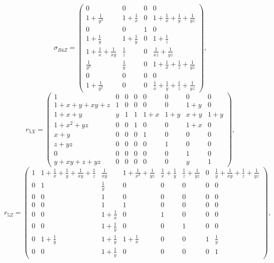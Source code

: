\[
 \sigma_{B4Z} =
\left(\begin{array}{cc|c|c}
 0 & 0 & 0 & 0 \\
\hline
 1+\frac{1}{y^2} & 1+\frac{1}{x} & 0 & 1+\frac{1}{x}+\frac{1}{y}+\frac{1}{y z} \\
\hline
 0 & 0 & 1 & 0 \\
\hline
 1+\frac{1}{y} & 1+\frac{1}{y} & 0 & 1+\frac{1}{z} \\
 1+\frac{1}{x}+\frac{1}{x y} & \frac{1}{z} & 0 & \frac{1}{x z}+\frac{1}{y z} \\
 \frac{1}{y^2} & \frac{1}{y} & 0 & 1+\frac{1}{x}+\frac{1}{z}+\frac{1}{y z} \\
\hline
 0 & 0 & 0 & 0 \\
\hline
 1+\frac{1}{y^2} & 0 & 0 & \frac{1}{x}+\frac{1}{y}+\frac{1}{z}+\frac{1}{y z}
\end{array}\right),
\]
\[
 r_{5X} =
\left(\begin{array}{cccccccc}
 1 & 0 & 0 & 0 & 0 & 0 & 0 & 0 \\
 1+x+y+x y+z & 1 & 0 & 0 & 0 & 0 & 1+y & 0 \\
 1+x+y & y & 1 & 1 & 1+x & 1+y & x+y & 1+y \\
 1+x^2+y z & 0 & 0 & 1 & 0 & 0 & 1+x & 0 \\
 x+y & 0 & 0 & 0 & 1 & 0 & 0 & 0 \\
 z+y z & 0 & 0 & 0 & 0 & 1 & 0 & 0 \\
 0 & 0 & 0 & 0 & 0 & 0 & 1 & 0 \\
 y+x y+z+y z & 0 & 0 & 0 & 0 & 0 & y & 1
\end{array}\right),
\]
\[
 r_{5Z} =
\left(\begin{array}{cccccccc}
 1 & 1+\frac{1}{x}+\frac{1}{y}+\frac{1}{x y}+\frac{1}{z} & \frac{1}{x y} & 1+\frac{1}{x^2}+\frac{1}{y z} & \frac{1}{x}+\frac{1}{y} & \frac{1}{z}+\frac{1}{y z} & 0 & \frac{1}{y}+\frac{1}{x y}+\frac{1}{z}+\frac{1}{y z} \\
 0 & 1 & \frac{1}{y} & 0 & 0 & 0 & 0 & 0 \\
 0 & 0 & 1 & 0 & 0 & 0 & 0 & 0 \\
 0 & 0 & 1 & 1 & 0 & 0 & 0 & 0 \\
 0 & 0 & 1+\frac{1}{x} & 0 & 1 & 0 & 0 & 0 \\
 0 & 0 & 1+\frac{1}{y} & 0 & 0 & 1 & 0 & 0 \\
 0 & 1+\frac{1}{y} & 1+\frac{1}{y} & 1+\frac{1}{x} & 0 & 0 & 1 & \frac{1}{y} \\
 0 & 0 & 1+\frac{1}{y} & 0 & 0 & 0 & 0 & 1
\end{array}\right),
\]
